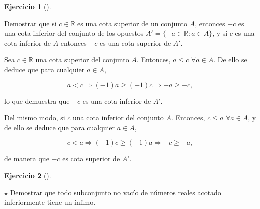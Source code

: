 \documentclass[
  a4paper,
]{scrreport}
\theoremstyle{definition}
\newtheorem{exercise}{Ejercicio}[chapter]
\theoremstyle{remark}
\begin{document}
\leavevmode{}%
\begin{exercise}[]\label{exr-cotas-conjunto-opuestos}

Demostrar que si \(c\in\mathbb{R}\) es una cota superior de un conjunto
\(A\), entonces \(-c\) es una cota inferior del conjunto de los opuestos
\(A'=\{-a\in\mathbb{R}: a\in A\}\), y si \(c\) es una cota inferior de
\(A\) entonces \(-c\) es una cota superior de \(A'\).

\end{exercise}

\begin{tcolorbox}[enhanced jigsaw, colbacktitle=quarto-callout-tip-color!10!white, coltitle=black, arc=.35mm, opacityback=0, breakable, colback=white, bottomtitle=1mm, opacitybacktitle=0.6, rightrule=.15mm, colframe=quarto-callout-tip-color-frame, title=\textcolor{quarto-callout-tip-color}{\faLightbulb}\hspace{0.5em}{Solución}, toptitle=1mm, titlerule=0mm, bottomrule=.15mm, left=2mm, leftrule=.75mm, toprule=.15mm]

Sea \(c\in\mathbb{R}\) una cota superior del conjunto \(A\). Entonces,
\(a\leq c\) \(\forall a\in A\). De ello se deduce que para cualquier
\(a\in A\),

\[
a<c \Rightarrow (-1)a\geq (-1)c \Rightarrow -a\geq -c, 
\]

lo que demuestra que \(-c\) es una cota inferior de \(A'\).

Del mismo modo, si \(c\) una cota inferior del conjunto \(A\). Entonces,
\(c\leq a\) \(\forall a\in A\), y de ello se deduce que para cualquier
\(a\in A\),

\[
c<a \Rightarrow (-1)c\geq (-1)a \Rightarrow -c\geq -a, 
\]

de manera que \(-c\) es cota superior de \(A'\).

\end{tcolorbox}

\leavevmode{}%
\begin{exercise}[]\label{exr-propiedad-infimo}

\(\star\) Demostrar que todo subconjunto no vacío de números reales
acotado inferiormente tiene un ínfimo.

\end{exercise}
\end{document}

